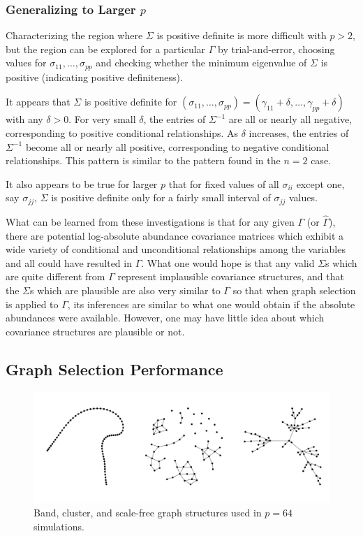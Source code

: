 \documentclass[10pt]{article}
\begin{document}
\subsubsection*{Generalizing to Larger $p$}

Characterizing the region where $\Sigma$ is positive definite is more difficult with $p > 2$, but the region can be explored for a particular $\Gamma$ by trial-and-error, choosing values for $\sigma_{11}, \dots, \sigma_{pp}$ and checking whether the minimum eigenvalue of $\Sigma$ is positive (indicating positive definiteness).

It appears that $\Sigma$ is positive definite for $(\sigma_{11}, \dots, \sigma_{pp}) = (\gamma_{11} + \delta, \dots, \gamma_{pp} + \delta)$ with any $\delta > 0$. For very small $\delta$, the entries of $\Sigma^{-1}$ are all or nearly all negative, corresponding to positive conditional relationships. As $\delta$ increases, the entries of $\Sigma^{-1}$ become all or nearly all positive, corresponding to negative conditional relationships. This pattern is similar to the pattern found in the $n = 2$ case.

It also appears to be true for larger $p$ that for fixed values of all $\sigma_{ii}$ except one, say $\sigma_{jj}$, $\Sigma$ is positive definite only for a fairly small interval of $\sigma_{jj}$ values.

What can be learned from these investigations is that for any given $\Gamma$ (or $\hat{\Gamma}$), there are potential log-absolute abundance covariance matrices which exhibit a wide variety of conditional and unconditional relationships among the variables and all could have resulted in $\Gamma$. What one would hope is that any valid $\Sigma$s which are quite different from $\Gamma$ represent implausible covariance structures, and that the $\Sigma$s which are plausible are also very similar to $\Gamma$ so that when graph selection is applied to $\Gamma$, its inferences are similar to what one would obtain if the absolute abundances were available. However, one may have little idea about which covariance structures are plausible or not.

\subsection*{Graph Selection Performance}

\begin{figure}
\caption{Band, cluster, and scale-free graph structures used in $p = 64$ simulations.}
\label{f:graphs}
\begin{center}
\includegraphics[width=6.5in]{figs/graphs-64.pdf}
\end{center}
\end{figure}
\end{document}
